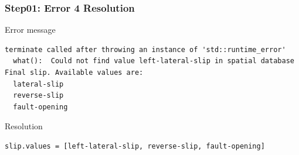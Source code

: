 \documentclass{beamer}
\newcommand{\errlabel}[1]{{\small \color{blue}#1}}
\begin{document}
\begin{frame}[fragile]
  \frametitle{Step01: Error 4 Resolution}

\errlabel{Error message}
\begin{lstlisting}
terminate called after throwing an instance of 'std::runtime_error'
  what():  Could not find value left-lateral-slip in spatial database
Final slip. Available values are:
  lateral-slip
  reverse-slip
  fault-opening
\end{lstlisting}\pause
\errlabel{Resolution}
\begin{lstlisting}
slip.values = [left-lateral-slip, reverse-slip, fault-opening]
\end{lstlisting}

\end{frame}
\end{document}
